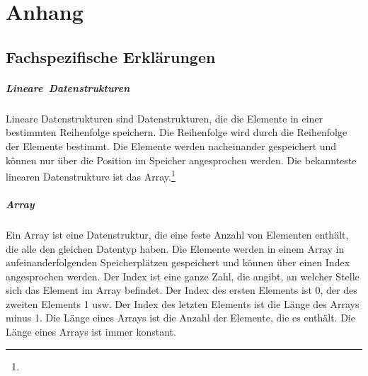 \documentclass[./entry.tex]{subfiles}
\begin{document}
    \chapter{Anhang}

    \section{Fachspezifische Erklärungen}

    \paragraph{Lineare\ Datenstrukturen}
    Lineare Datenstrukturen sind Datenstrukturen, die die Elemente in einer bestimmten Reihenfolge speichern. Die
    Reihenfolge wird durch die Reihenfolge der Elemente bestimmt. Die Elemente werden nacheinander gespeichert und
    können nur über die Position im Speicher angesprochen werden. Die bekannteste linearen Datenstrukture ist
    das Array.\footnote{}
    \paragraph{Array}
    Ein Array ist eine Datenstruktur, die eine feste Anzahl von Elementen enthält, die alle den gleichen Datentyp
    haben. Die Elemente werden in einem Array in aufeinanderfolgenden Speicherplätzen gespeichert und können über einen
    Index angesprochen werden. Der Index ist eine ganze Zahl, die angibt, an welcher Stelle
    sich das Element im Array befindet. Der Index des ersten Elements ist 0, der des zweiten Elements 1 usw. Der Index
    des letzten Elements ist die Länge des Arrays minus 1. Die Länge eines Arrays ist die Anzahl der Elemente, die es
    enthält. Die Länge eines Arrays ist immer konstant.
\end{document}

